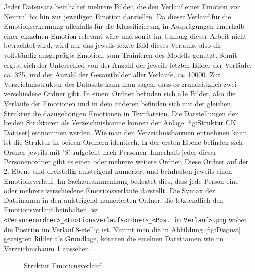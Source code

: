 \documentclass[12pt, a4paper]{report}
\begin{document}
Jeder Datensatz beinhaltet mehrere Bilder, die den Verlauf einer Emotion von Neutral bis hin zur jeweiligen Emotion darstellen. Da dieser Verlauf für die Emotionserkennung allenfalls für die Klassifizierung in Ausprägungen innerhalb einer einzelnen Emotion relevant wäre und somit im Umfang dieser Arbeit nicht betrachtet wird, wird nur das jeweils letzte Bild dieses Verlaufs, also die vollständig ausgeprägte Emotion, zum Trainieren des Modells genutzt. Somit ergibt sich der Unterschied von der Anzahl der jeweils letzten Bilder der Verläufe, ca. 325, und der Anzahl der Gesamtbilder aller Verläufe, ca. 10000.
Zur Verzeichnisstruktur des Datasets kann man sagen, dass es grundsätzlich zwei verschiedene Ordner gibt. In einem Ordner befinden sich alle Bilder, also die Verläufe der Emotionen und in dem anderen befinden sich mit der gleichen Struktur die dazugehörigen Emotionen in Textdateien. Die Darstellungen der beiden Strukturen als Verzeichnisbäume können der Anlage \ref{fig:Struktur CK Dataset} entnommen werden. Wie man den Verzeichnisbäumen entnehmen kann, ist die Struktur in beiden Ordnern identisch. In der ersten Ebene befinden sich Ordner jeweils mit 'S' aufgeteilt nach Personen. Innerhalb jeder dieser Personenordner gibt es einen oder mehrere weitere Ordner. Diese Ordner auf der 2. Ebene sind dreistellig aufsteigend numeriert und beinhalten jeweils einen Emotionsverlauf. Im Sachzusammenhang bedeutet dies, dass jede Person eine oder mehrere verschiedene Emotionsverläufe darstellt. Die Syntax der Dateinamen in den aufsteigend numerierten Ordner, die letztendlich den Emotionsverlauf beinhalten, ist \texttt{<Personenordner>\_<Emotionsverlaufsordner>\_<Pos. im Verlauf>.png} wobei die Position im Verlauf 8-stellig ist. Nimmt man die in Abbildung \ref{fig:Disgust} gezeigten Bilder als Grundlage, könnten die einelnen Dateinamen wie im Verzeichnisbaum \ref{fig:Tree Emotionsverlauf} aussehen.
\begin{figure}
\caption{Struktur Emotionsverlauf}
\label{fig:Tree Emotionsverlauf}
\end{figure}
\end{document}
